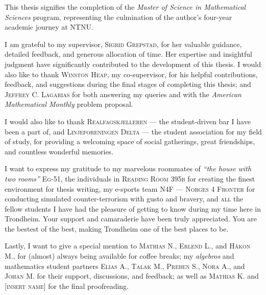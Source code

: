 




\vspace{.25in}

This thesis signifies the completion of the \textit{Master of Science in Mathematical Sciences} program, representing the culmination of the author's four-year academic journey at NTNU.

I am grateful to my supervisor, \textsc{Sigrid Grepstad}, for her valuable guidance, detailed feedback, and generous allocation of time. Her expertise and insightful judgment have significantly contributed to the development of this thesis. I would also like to thank \textsc{Winston Heap}, my co-supervisor, for his helpful contributions, feedback, and suggestions during the final stages of completing this thesis; and \textsc{Jeffrey C. Lagarias} for both answering my queries and with the \emph{American Mathematical Monthly} problem proposal.   

I would also like to thank \textsc{Realfagskjelleren} — the student-driven bar I have been a part of, and \textsc{Linjeforeningen Delta} — the student association for my field of study, for providing a welcoming space of social gatherings, great friendships, and countless wonderful memories. 

I want to express my gratitude to my marvelous roommates of \emph{\enquote{the house with two rooms}} \textsc{Eg-51}, the individuals in \textsc{Reading Room 395b} for creating the finest environment for thesis writing, my e-sports team \textsc{N4F — Norges 4 Fronter} for conducting simulated counter-terrorism with gusto and bravery, and \textsc{all} the fellow students I have had the pleasure of getting to know during my time here in Trondheim. Your support and camaraderie have been truly appreciated. You are the bestest of the best, making Trondheim one of the best places to be. 

Lastly, I want to give a special mention to \textsc{Mathias N.}, \textsc{Erlend L.}, and \textsc{Håkon M.}, for (almost) always being available for coffee breaks; my \emph{algebros} and mathematics student partners \textsc{Elias A.}, \textsc{Talak M.}, \textsc{Preben S.}, \textsc{Nora A.}, and \textsc{Johan M.} for their support, discussions, and feedback; as well as \textsc{Mathias K.} and \textsc{[insert name]} for the final proofreading.


